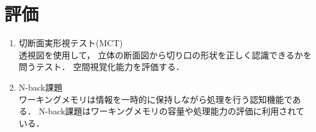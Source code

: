 \section{評価}
  \begin{enumerate}
    \item 切断面実形視テスト(MCT)\cite{MCT} \mbox{}\\
      透視図を使用して，
      立体の断面図から切り口の形状を正しく認識できるかを問うテスト．
      空間視覚化能力を評価する．
    \item N-back課題 \mbox{}\\
      ワーキングメモリは情報を一時的に保持しながら処理を行う認知機能である．
      N-back課題はワーキングメモリの容量や処理能力の評価に利用されている\cite{N-back}．
  \end{enumerate}

